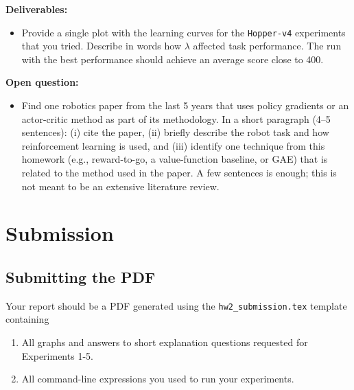 \documentclass{article}
\begin{document}
\textbf{Deliverables:}
\begin{itemize}
    \item Provide a single plot with the learning curves for the \verb|Hopper-v4| experiments that you tried. Describe in words how $\lambda$ affected task performance. The run with the best performance should achieve an average score close to 400. 
\end{itemize}

\textbf{Open question:}
\begin{itemize}
    \item Find one robotics paper from the last 5 years that uses policy gradients or an actor-critic method as part of its methodology. 
    In a short paragraph (4--5 sentences): (i) cite the paper, (ii) briefly describe the robot task and how reinforcement learning is used, and (iii) identify one technique from this homework (e.g., reward-to-go, a value-function baseline, or GAE) that is related to the method used in the paper. A few sentences is enough; this is not meant to be an extensive literature review.
\end{itemize}

% 
\section{Submission}


\subsection{Submitting the PDF}
Your report should be a PDF generated using the \texttt{hw2\_submission.tex} template containing 
\begin{enumerate} [label=(\alph*)]
\item All graphs and answers to short explanation questions requested for Experiments 1-5.
\item All command-line expressions you used to run your experiments.
\end{enumerate}
\end{document}
